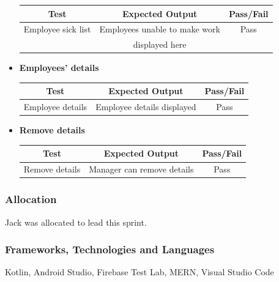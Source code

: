 \begin{itemize}
\begin{center}
\begin{tabular}{||c c c||}
      Test & Expected Output & Pass/Fail \\ [0.5ex] 
      \hline\hline
       Employee sick list & Employees unable to make work  & Pass \\
         & displayed here  &   \\
      \hline
     \end{tabular}
    \end{center}
    \item \textbf{Employees' details}
    \begin{center}
     \begin{tabular}{||c c c||} 
      \hline
      Test & Expected Output & Pass/Fail \\ [0.5ex] 
      \hline\hline
      Employee details & Employee details displayed & Pass \\
      \hline
     \end{tabular}
    \end{center}
    \item \textbf{Remove details}
    \begin{center}
     \begin{tabular}{||c c c||} 
      \hline
      Test & Expected Output & Pass/Fail \\ [0.5ex] 
      \hline\hline
      Remove details & Manager can remove details & Pass \\
      \hline
     \end{tabular}
    \end{center}
\end{itemize}

\subsubsection{Allocation}
Jack was allocated to lead this sprint.
\subsubsection{Frameworks, Technologies and Languages}
Kotlin, Android Studio, Firebase Test Lab, MERN, Visual Studio Code
